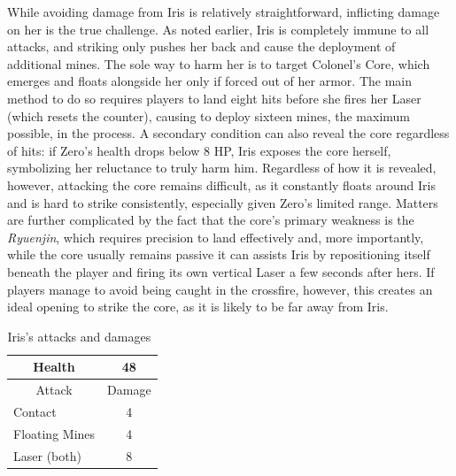 While avoiding damage from Iris is relatively straightforward, inflicting damage on her is the true challenge. As noted earlier, Iris is completely immune to all attacks, and striking only pushes her back  and cause the deployment of additional mines. The sole way to harm her is to target Colonel’s Core, which emerges and floats alongside her only if forced out of her armor. The main method to do so requires players to land eight hits before she fires her Laser (which resets the counter), causing to deploy sixteen mines, the maximum possible, in the process. A secondary condition can also reveal the core regardless of hits: if Zero’s health drops below 8 HP, Iris exposes the core herself, symbolizing her reluctance to truly harm him. Regardless of how it is revealed, however, attacking the core remains difficult, as it constantly floats around Iris and is hard to strike consistently, especially given Zero’s limited range. Matters are further complicated by the fact that the core’s primary weakness is the \emph{Ryuenjin}, which requires precision to land effectively and, more importantly, while the core usually remains passive it can assists Iris by repositioning itself beneath the player and firing its own vertical Laser a few seconds after hers. If players manage to avoid being caught in the crossfire, however, this creates an ideal opening to strike the core, as it is likely to be far away from Iris.


\begin{table}[htp]
	\centering
	\begin{tabular}[h]{l c}
		\toprule
		\multicolumn{1}{c}{Health}  & 48\\
		\midrule
		\multicolumn{1}{c}{Attack} & \multicolumn{1}{c}{Damage}\\
		Contact & 4 \\
		Floating Mines & 4 \\
		Laser (both)& 8\\
		\bottomrule
	\end{tabular}
	\caption{Iris's attacks and damages~\cite{book:Compendium,wiki:Iris}}
\end{table}

